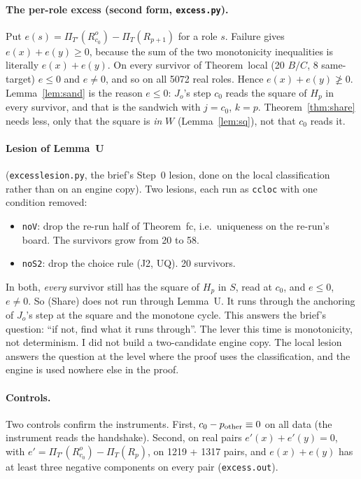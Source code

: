 \documentclass[11pt]{article}
\theoremstyle{definition}\newtheorem{definition}[theorem]{Definition}\newtheorem{remark}[theorem]{Remark}
\begin{document}
\paragraph{The per-role excess (second form, \texttt{excess.py}).} Put $e(s)=\Pi_{T'}(R^o_{c_0})-\Pi_T(R_{p+1})$ for a role $s$. Failure gives $e(x)+e(y)\ge0$, because the sum of the two monotonicity inequalities is literally $e(x)+e(y)$. On every survivor of Theorem~local (20 $B/C$, 8 same-target) $e\le0$ and $e\ne0$, and so on all 5072 real roles. Hence $e(x)+e(y)\not\ge0$. Lemma~\ref{lem:sand} is the reason $e\le0$: $J_o$'s step $c_0$ reads the square of $H_p$ in every survivor, and that is the sandwich with $j=c_0$, $k=p$. Theorem~\ref{thm:share} needs less, only that the square is \emph{in} $W$ (Lemma~\ref{lem:sq}), not that $c_0$ reads it.
\paragraph{Lesion of Lemma~U} (\texttt{excesslesion.py}, the brief's Step~0 lesion, done on the local classification rather than on an engine copy). Two lesions, each run as \texttt{ccloc} with one condition removed:
\begin{itemize}
\item \texttt{noV}: drop the re-run half of Theorem~fc, i.e.\ uniqueness on the re-run's board. The survivors grow from 20 to 58.
\item \texttt{noS2}: drop the choice rule (J2, UQ). 20 survivors.
\end{itemize}
In both, \emph{every} survivor still has the square of $H_p$ in $S$, read at $c_0$, and $e\le0$, $e\ne0$. So (Share) does not run through Lemma~U. It runs through the anchoring of $J_o$'s step at the square and the monotone cycle. This answers the brief's question: ``if not, find what it runs through''. The lever this time is monotonicity, not determinism. I did not build a two-candidate engine copy. The local lesion answers the question at the level where the proof uses the classification, and the engine is used nowhere else in the proof.
\paragraph{Controls.} Two controls confirm the instruments. First, $c_0-p_{\rm other}\equiv0$ on all data (the instrument reads the handshake). Second, on real pairs $e'(x)+e'(y)=0$, with $e'=\Pi_{T'}(R^o_{c_0})-\Pi_T(R_p)$, on 1219 + 1317 pairs, and $e(x)+e(y)$ has at least three negative components on every pair (\texttt{excess.out}).
\end{document}
